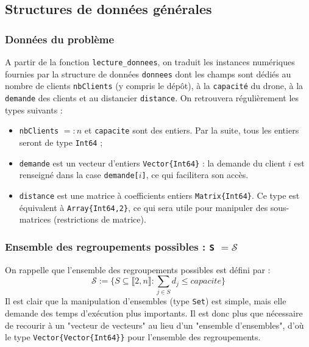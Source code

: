 \documentclass[french, 11pt, a4paper]{article} %
\newcommand{\Sc}{\mathcal{S}} %
\newcommand{\smb}{\smallbreak}
\begin{document}
\subsection{Structures de données générales}

\subsubsection{Données du problème}
A partir de la fonction \verb+lecture_donnees+, on traduit les instances numériques fournies
par la structure de données 
\verb+donnees+ dont les champs sont dédiés au nombre de clients \verb+nbClients+ (y compris le dépôt), à
la \verb+capacité+ du drone, à la \verb+demande+ des clients et au distancier \verb+distance+. On retrouvera régulièrement les types suivants :
\begin{itemize}
    \item \verb+nbClients+ $=:n$ et \verb+capacite+ sont des entiers. Par la suite, tous les entiers seront de type \verb+Int64+ ;
    \item \verb+demande+ est un vecteur d'entiers \verb+Vector{Int64}+ : la demande du client $i$ est renseigné dans la case \verb+demande[+$i$\verb+]+, ce qui facilitera son accès.
    \item \verb+distance+ est une matrice à coefficients entiers \verb+Matrix{Int64}+. Ce type est équivalent à \verb+Array{Int64,2}+, ce qui sera utile pour manipuler des sous-matrices (restrictions de matrice).
\end{itemize}

\subsubsection{Ensemble des regroupements possibles : \texttt{S} $ = \Sc$}
On rappelle que l'ensemble des regroupements possibles est défini par :
\[\Sc := \Bigg\{ S \subseteq \llbracket 2,n \rrbracket : \sum_{j \in S} d_j \leq capacite \Bigg\} \]
\smb Il est clair que la manipulation d'ensembles (type \verb+Set+) est simple, mais elle demande des temps d'exécution plus importants.
Il est donc plus que nécessaire de recourir à un "vecteur de vecteurs" au lieu d'un "ensemble d'ensembles", d'où
le type \verb+Vector{Vector{Int64}}+ pour l'ensemble des regroupements.
\end{document}

